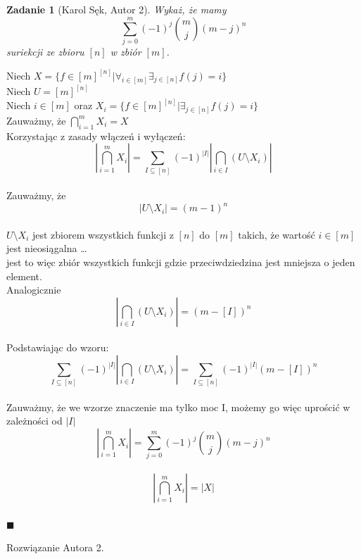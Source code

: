 \documentclass{mwart}
\newtheorem{zad}{Zadanie}[section]
\begin{document}
\begin{zad}[Karol Sęk, Autor 2]
    Wykaż, że mamy
    \[
        \sum_{j=0}^{m}(-1)^j \binom{m}{j}(m-j)^n
    \]
    suriekcji ze zbioru $[n]$ w zbiór $[m]$.
\end{zad}
\begin{mdframed}
    Niech $X = \{f \in [m]^{[n]}| \forall_{i \in [m]} \exists_{j \in [n]} f(j) = i\}$\\
    Niech $U = [m]^{[n]}$\\
    Niech $i \in [m]$ oraz $X_i = \{f \in [m]^{[n]}| \exists_{j \in [n]} f(j) = i\}$\\
    Zauważmy, że $\bigcap_{i = 1}^{m} X_i = X$\\

    Korzystając z zasady włączeń i wyłączeń:\\

    $$|\bigcap_{i = 1}^{m} X_i| = \sum_{I \subseteq [n]} (-1)^{|I|} |\bigcap_{i \in I} (U \setminus X_i)|$$\\

    Zauważmy, że\\
    $$|U \setminus X_i| = (m-1)^{n}$$\\
    $U \setminus X_i$ jest zbiorem wszystkich funkcji z $[n]$ do $[m]$ takich, że wartość $i \in [m]$ jest nieosiągalna \dots\\
    jest to więc zbiór wszystkich funkcji gdzie przeciwdziedzina jest mniejsza o jeden element.\\

    Analogicznie\\
    $$|\bigcap_{i \in I} (U \setminus X_i)| = (m-[I])^n$$\\

    Podstawiając do wzoru:\\
    $$\sum_{I \subseteq [n]} (-1)^{|I|} |\bigcap_{i \in I} (U \setminus X_i)| =\sum_{I \subseteq [n]} (-1)^{|I|} (m-[I])^n$$\\

    Zauważmy, że we wzorze znaczenie ma tylko moc I, możemy go więc uprościć w zależności od $|I|$\\

    $$|\bigcap_{i = 1}^{m} X_i| = \sum_{j=0}^{m}(-1)^j \binom{m}{j}(m-j)^n$$\\
    $$|\bigcap_{i = 1}^{m} X_i| = |X|$$\\

    $\blacksquare$\\

\end{mdframed}
\begin{mdframed}
    Rozwiązanie Autora 2.
\end{mdframed}
\end{document}
